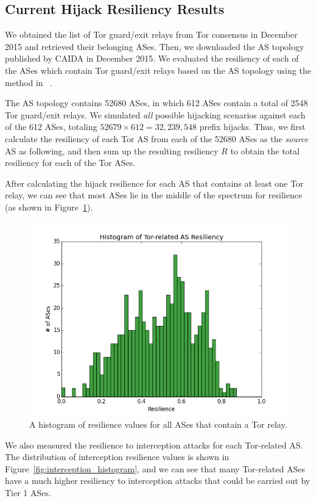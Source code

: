 \subsection{Current Hijack Resiliency Results}

We obtained the list of Tor guard/exit relays from Tor consensus in December 2015 and retrieved their belonging ASes. Then, we downloaded the AS topology published by CAIDA in December 2015. We evaluated the resiliency of each of the ASes which contain Tor guard/exit relays based on the AS topology using the method in ~\cite{lad2007understanding}. 

The AS topology contains 52680 ASes, in which 612 ASes contain a total of 2548 Tor guard/exit relays. We simulated \emph{all} possible hijacking scenarios against each of the 612 ASes, totaling $52679 \times 612 = 32,239,548$ prefix hijacks. Thus, we first calculate the resiliency of each Tor AS from each of the 52680 ASes as the \emph{source} AS as following, and then sum up the resulting resiliency $R$ to obtain the total resiliency for each of the Tor ASes. 

After calculating the hijack resilience for each AS that contains at least one Tor relay, we can see that most ASes lie in the middle of the spectrum for resilience (as shown in Figure~\ref{fig:resilience_histogram}).

\begin{figure}
\centering
\includegraphics[width=.5\textwidth]{resilience_histogram}
\caption{A histogram of resilience values for all ASes that contain a Tor relay.}
\label{fig:resilience_histogram}
\end{figure}

We also measured the resilience to interception attacks for each Tor-related AS.  The distribution of interception resilience values is shown in Figure~\ref{fig:interception_histogram}, and we can see that many Tor-related ASes have a much higher resiliency to interception attacks that could be carried out by Tier 1 ASes.  

